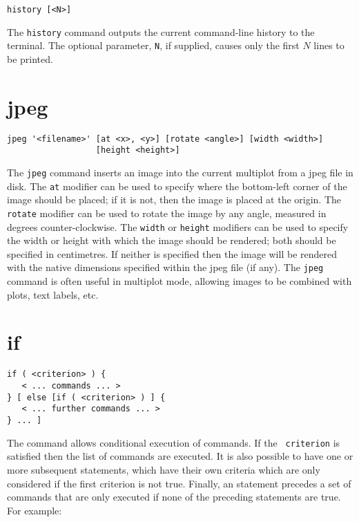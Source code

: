 \begin{verbatim}
history [<N>]
\end{verbatim}

The {\tt history} command outputs the current command-line history to the
terminal.  The optional parameter, {\tt N}, if supplied, causes only the first
$N$ lines to be printed.

\section{jpeg}

\begin{verbatim}
jpeg '<filename>' [at <x>, <y>] [rotate <angle>] [width <width>]
                  [height <height>]
\end{verbatim}

The {\tt jpeg} command inserts an image into the current multiplot from a jpeg
file in disk.  The {\tt at} modifier can be used to specify where the
bottom-left corner of the image should be placed; if it is not, then the image
is placed at the origin. The {\tt rotate} modifier can be used to rotate the
image by any angle, measured in degrees counter-clockwise.  The {\tt width} or
{\tt height} modifiers can be used to specify the width or height with which
the image should be rendered; both should be specified in centimetres. If
neither is specified then the image will be rendered with the native dimensions
specified within the jpeg file (if any). The {\tt jpeg} command is often useful
in multiplot mode, allowing images to be combined with plots, text labels, etc.

\section{if}

\begin{verbatim}
if ( <criterion> ) {
   < ... commands ... >
} [ else [if ( <criterion> ) ] {
   < ... further commands ... >
} ... ]
\end{verbatim}

The  command allows conditional execution of commands.  If the {\tt
criterion} is satisfied then the list of commands are executed.  It is also
possible to have one or more subsequent  statements, which have
their own criteria which are only considered if the first criterion is not true.
Finally, an  statement precedes a set of commands that are only
executed if none of the preceding statements are true.  For example:

